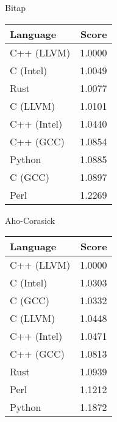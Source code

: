 \begin{subtable}{0.33\textwidth}
    \centering
    \caption{Bitap}
    \label{table:energy:shift_or}
    \begin{tabular}{|l|r|}
        \hline
        Language & Score \\
        \hline
        C++ (LLVM) & 1.0000 \\
        C (Intel) & 1.0049 \\
        Rust & 1.0077 \\
        C (LLVM) & 1.0101 \\
        C++ (Intel) & 1.0440 \\
        C++ (GCC) & 1.0854 \\
        Python & 1.0885 \\
        C (GCC) & 1.0897 \\
        Perl & 1.2269 \\
        \hline
    \end{tabular}
\end{subtable}
\begin{subtable}{0.33\textwidth}
    \centering
    \caption{Aho-Corasick}
    \label{table:energy:aho_corasick}
    \begin{tabular}{|l|r|}
        \hline
        Language & Score \\
        \hline
        C++ (LLVM) & 1.0000 \\
        C (Intel) & 1.0303 \\
        C (GCC) & 1.0332 \\
        C (LLVM) & 1.0448 \\
        C++ (Intel) & 1.0471 \\
        C++ (GCC) & 1.0813 \\
        Rust & 1.0939 \\
        Perl & 1.1212 \\
        Python & 1.1872 \\
        \hline
    \end{tabular}
\end{subtable}%

